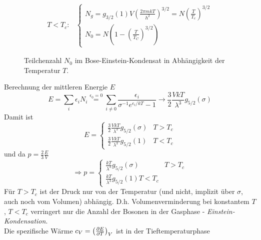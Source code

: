 \begin{enumerate}[A)]
\begin{enumerate}[i)]
\begin{equation}
\begin{split}
                T < T_c: &
                \begin{cases}
                    N_g = g_{3/2}(1) V \left( \frac{2 \pi m k T}{h^2} \right)^{3/2} = N \left( \frac{T}{T_c} \right)^{3/2} \\
                    N_0 = N \left( 1 - \left( \frac{T}{T_C} \right)^{3/2} \right)
                \end{cases}
            \end{split}
        \end{equation}
        \begin{figure}[H]
        \centering
        \def\svgwidth{0.5\textwidth}
        
        \caption{Teilchenzahl $N_0$ im Bose-Einstein-Kondensat in Abhängigkeit der Temperatur $T$.}
        \label{img:BEC_N0_N_T}
        \end{figure}
        Berechnung der mittleren Energie $E$
        \begin{equation}
            E = \sum_i \epsilon_i N_i \overset{\epsilon_0=0}{=} \sum_{i \neq 0} \frac{\epsilon_i}{\sigma^{-1} e^{\epsilon_i / k T} - 1} \rightarrow \frac{3}{2} \frac{V k T}{\lambda^3} g_{5/2}(\sigma)
        \end{equation}
        Damit ist
        \begin{equation}
            E =
            \begin{cases}
                \frac{3}{2} \frac{V k T}{\lambda^3} g_{5/2}(\sigma) & T > T_c \\
                \frac{3}{2} \frac{V k T}{\lambda^3} g_{5/2}(1) & T < T_c
            \end{cases}
        \end{equation}
        und da $p = \frac{2}{3} \frac{E}{V}$
        \begin{equation}
            \Rightarrow p =
            \begin{cases}
                \frac{k T}{\lambda^3} g_{5/2}(\sigma) & T > T_c \\
                \frac{k T}{\lambda^3} g_{5/2}(1) T < T_c
            \end{cases}
        \end{equation}
        Für $T > T_c$ ist der Druck nur von der Temperatur (und nicht, implizit über $\sigma$, auch noch vom Volumen) abhängig. D.h. Volumenverminderung
        bei konstantem $T$, $T < T_c$ verringert nur die Anzahl der Bosonen in der Gasphase - \emph{Einstein-Kondensation}. \\
        Die spezifische Wärme $c_V = \left( \frac{\partial E}{\partial T} \right)_{V}$ ist in der Tieftemperaturphase

\end{enumerate}
\end{enumerate}
